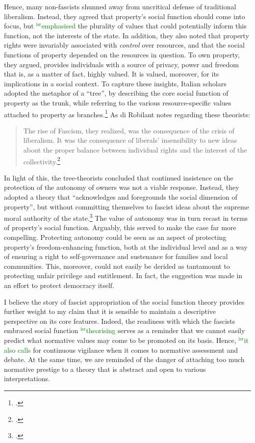\documentclass[12pt,a4paper]{book} %
\newcommand{\isr}[1]{\textcolor{green}{$^{\textrm{isr}}${#1}}}
\begin{document}
Hence, many non-fascists shunned away from uncritical defense of traditional liberalism. Instead, they agreed that property's social function should come into focus, but \isr{emphasised} the plurality of values that could potentially inform this function, not the interests of the state. In addition, they also noted that property rights were invariably associated with {\it control} over resources, and that the social functions of property depended on the resources in question. To own property, they argued, provides individuals with a source of privacy, power and freedom that is, as a matter of fact, highly valued. It is valued, moreover, for its implications in a social context. To capture these insights, Italian scholars adopted the metaphor of a ``tree'', by describing the core social function of property as the trunk, while referring to the various resource-specific values attached to property as branches.\footcite[894-916]{robilant13} As di Robilant notes regarding these theorists:

\begin{quote}
The rise of Fascism, they realized, was the
consequence of the crisis of liberalism. It was the consequence of liberals' insensibility to new ideas about the proper balance between individual rights and the interest of the collectivity.\footcite[907]{robilant13}
\end{quote}

In light of this, the tree-theorists concluded that continued insistence on the protection of the autonomy of owners was not a viable response. Instead, they adopted a theory that ``acknowledges and foregrounds the social dimension of property'', but without committing themselves to fascist ideas about the supreme moral authority of the state.\footcite[907]{robilant13} The value of autonomy was in turn recast in terms of property's social function. Arguably, this served to make the case far more compelling. Protecting autonomy could be seen as an aspect of protecting property's freedom-enhancing function, both at the individual level and as a way of ensuring a right to self-governance and sustenance for families and local communities. This, moreover, could not easily be derided as tantamount to protecting unfair privilege and entitlement. In fact, the suggestion was made in an effort to protect democracy itself.

I believe the story of fascist appropriation of the social function theory provides further weight to my claim that it is sensible to  maintain a descriptive perspective on its core features. Indeed, the readiness with which the fascists embraced social function \isr{theorising} serves as a reminder that we cannot easily predict what normative values may come to be promoted on its basis. Hence, \isr{it also calls} for continuous vigilance when it comes to normative assessment and debate. At the same time, we are reminded of the danger of attaching too much normative prestige to a theory that is abstract and open to various interpretations.
\end{document}
